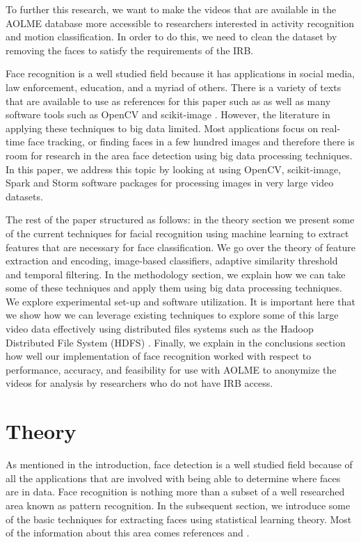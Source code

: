 \documentclass[
	submission,
	final,
	notitlepage,
	narroweqnarray,
	inline,
	twoside,
	]{ieee}
\begin{document}
To further this research, we want to make the videos that are available
in the AOLME database more accessible to researchers interested in 
activity recognition and motion classification. In order to do this, 
we need to clean the dataset by removing the faces to satisfy the requirements
of the IRB.

Face recognition is a well studied field because it has applications in 
social media, law enforcement, education, and a myriad of others. There is a 
variety of texts that are available to use as references for this paper such
as \cite{face_recog_book} \cite{kernel_learning} \cite{machine_face_recog} 
as well as many software tools such as OpenCV \cite{opencv} and scikit-image
\cite{scikit-image}. However, the literature in applying these techniques to 
big data limited. Most applications focus on real-time face tracking, or finding
faces in a few hundred images and therefore there is room for research in the area
face detection using big data processing techniques. In this paper, we address 
this topic by looking at using OpenCV, scikit-image, 
Spark and Storm software packages for processing images in very large
video datasets.

The rest of the paper structured as follows: in the theory section we 
present some of the current techniques for facial recognition using 
machine learning to extract features that are necessary for face 
classification. We go over the theory of feature extraction and encoding, 
image-based classifiers, adaptive similarity threshold and temporal filtering. 
In the methodology section, we explain how we can take some of these
techniques and apply them using big data processing techniques. 
We explore experimental set-up and software utilization. It is 
important here that we show how we can leverage existing techniques
to explore some of this large video data effectively using distributed
files systems such as the Hadoop Distributed File System (HDFS) \cite{hadoop}. 
Finally, we explain in the conclusions section how well our 
implementation of face recognition worked with respect to 
performance, accuracy, and feasibility for use with AOLME to
 anonymize the videos for analysis by researchers who do not have
IRB access.  

\section{Theory}
\PARstart As mentioned in the introduction, face detection is a well 
studied field because of all the applications that are involved with 
being able to determine where faces are in data. Face recognition
is nothing more than a subset of a well researched area known as 
pattern recognition. In the subsequent section, we introduce some
of the basic techniques for extracting faces using statistical 
learning theory. Most of the information about this area comes
references \cite{face_recog_book} and \cite{kernel_learning}.
\end{document}
